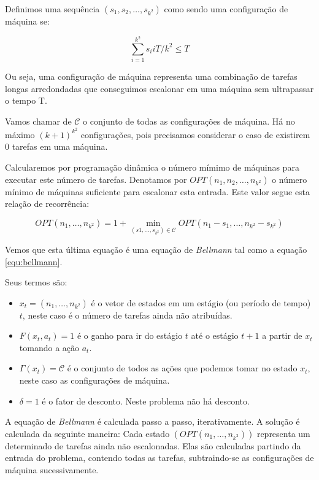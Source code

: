 Definimos uma sequência $(s_1, s_2, \ldots, s_{k^2})$ como sendo uma configuração de máquina se:

\begin{equation}
\sum_{i=1}^{k^2} s_i iT / k^2 \leq T
\end{equation}

Ou seja, uma configuração de máquina representa uma combinação de tarefas longas arredondadas que conseguimos escalonar em uma máquina sem ultrapassar o tempo T.

Vamos chamar de $ \mathcal{C} $ o conjunto de todas as configurações de máquina. Há no máximo $(k+1)^{k^2}$ configurações, pois precisamos considerar o caso de existirem $0$ tarefas em uma máquina.

Calcularemos por programação dinâmica o número mímimo de máquinas para executar este número de tarefas. Denotamos por $OPT(n_1, n_2, \ldots, n_{k^2})$ o número mínimo de máquinas suficiente para escalonar esta entrada. Este valor segue esta relação de recorrência:

\begin{equation}
OPT(n_1, \ldots, n_{k^2}) = 1 + \min_{(s1,\ldots,s_{k^2}) \in \mathcal{C}} OPT(n_1 - s_1, \ldots, n_{k^2} - s_{k^2})
\end{equation}

Vemos que esta última equação é uma equação de \textit{Bellmann} tal como a equação \ref{equ:bellmann}. 

Seus termos são: 

\begin{itemize}
\item $x_t = (n_1, \ldots, n_{k^2})$ é o vetor de estados em um estágio (ou período de tempo) $t$, neste caso é o número de tarefas ainda não atribuídas.
\item $F(x_t, a_t) = 1$ é o ganho para ir do estágio $t$ até o estágio $t+1$ a partir de $x_t$ tomando a ação $a_t$.
\item $\Gamma(x_t) = \mathcal{C}$ é o conjunto de todos as ações que podemos tomar no estado $x_t$, neste caso as configurações de máquina.
\item $\delta = 1$ é o fator de desconto. Neste problema não há desconto.
\end{itemize}

A equação de \textit{Bellmann} é calculada passo a passo, iterativamente. A solução é calculada da seguinte maneira: Cada estado $(OPT(n_1, \ldots, n_{k^2}))$ representa um determinado de tarefas ainda não escalonadas. Elas são calculadas partindo da entrada do problema, contendo todas as tarefas, subtraindo-se as configurações de máquina sucessivamente.

